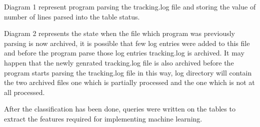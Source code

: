 \documentclass[a4paper,12pt,oneside]{sphinxmanual}
\begin{document}
\begin{DUlineblock}{0em}
\item[] Diagram 1 represent program parsing the tracking.log file and storing the value of number of lines parsed into the table status.
\item[] Diagram 2 represents the state when the file which program was previously parsing is now archived, it is possible that few log entries were added to this file and before the program parse those log entries tracking.log is archived. It may happen that the newly genrated tracking.log file is also archived before the program starts parsing the tracking.log file in this way, log directory will contain the two archived files one which is partially processed and the one which is not at all processed.
\end{DUlineblock}
\begin{figure}[htbp]
\centering

\end{figure}

After the classification has been done, queries were written on the tables to extract the features required for implementing machine learning.
\end{document}
